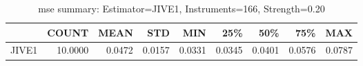 \begin{table}[ht]
\centering
\caption{mse summary: Estimator=JIVE1, Instruments=166, Strength=0.20}
\begin{tabular}{lrrrrrrrr}
\toprule
 & COUNT & MEAN & STD & MIN & 25\% & 50\% & 75\% & MAX \\
\midrule
JIVE1 & 10.0000 & 0.0472 & 0.0157 & 0.0331 & 0.0345 & 0.0401 & 0.0576 & 0.0787 \\
\bottomrule
\end{tabular}
\end{table}
